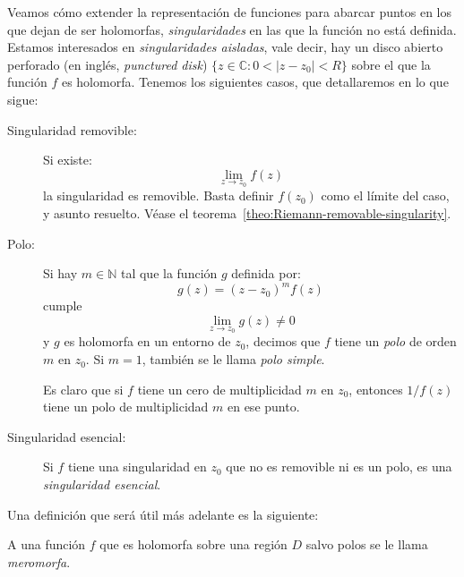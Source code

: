   Veamos cómo extender la representación de funciones
  para abarcar puntos en los que dejan de ser holomorfas,
  \emph{singularidades} en las que la función no está definida.
  Estamos interesados en \emph{singularidades aisladas},
  vale decir,
  hay un disco abierto perforado
  (en inglés, \emph{\foreignlanguage{english}{punctured disk}})
  \(\{ z \in \mathbb{C} \colon 0 < \lvert z - z_0 \rvert < R \}\)
  sobre el que la función \(f\) es holomorfa.
  Tenemos los siguientes casos,
  que detallaremos en lo que sigue:
  \begin{description}
  \item[Singularidad removible:]
    Si existe:
    \begin{equation*}
      \lim_{z \rightarrow z_0} f(z)
    \end{equation*}
    la singularidad es removible.
    Basta definir \(f(z_0)\) como el límite del caso,
    y asunto resuelto.%
    Véase el teorema~\ref{theo:Riemann-removable-singularity}.
  \item[Polo:]
    Si hay \(m \in \mathbb{N}\)
    tal que la función \(g\) definida por:
    \begin{equation*}
      g(z)
	= (z - z_0)^m f(z)
    \end{equation*}
    cumple
    \begin{equation*}
      \lim_{z \rightarrow z_0} g(z) \ne 0
    \end{equation*}
    y \(g\) es holomorfa en un entorno de \(z_0\),
    decimos que \(f\)
    tiene un \emph{polo} de orden \(m\) en \(z_0\).%
    Si \(m = 1\),
    también se le llama \emph{polo simple}.

    Es claro que si \(f\) tiene un cero de multiplicidad \(m\)
    en \(z_0\),
    entonces \(1 / f(z)\) tiene un polo de multiplicidad \(m\)
    en ese punto.
  \item[Singularidad esencial:]
    Si \(f\) tiene una singularidad en \(z_0\)
    que no es removible ni es un polo,
    es una \emph{singularidad esencial}.%
  \end{description}
  Una definición que será útil más adelante es la siguiente:
  \begin{definition}
    A una función \(f\) que es holomorfa sobre una región \(D\)
    salvo polos se le llama \emph{meromorfa}.%
  \end{definition}


